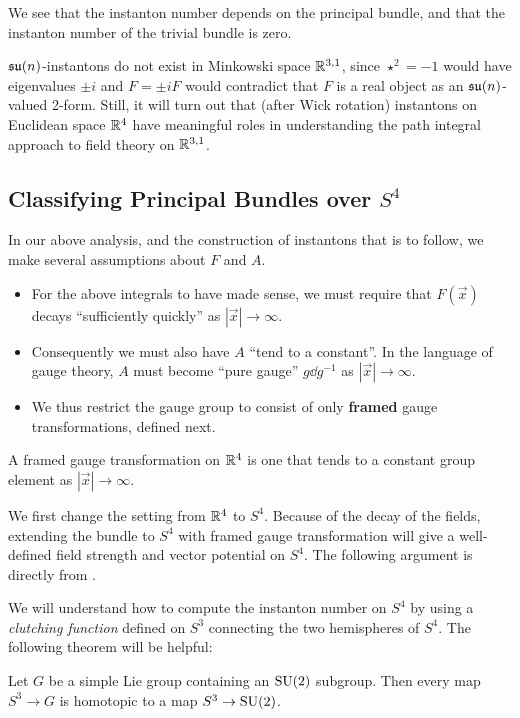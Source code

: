 	We see that the instanton number depends on the principal bundle, and that the instanton number of the trivial bundle is zero. 
	
	\begin{nb}
		$\frak{su}(n)$-instantons do not exist in Minkowski space $\mathbb{R}^{3,1}$, since $\star^2 = -1$ would have eigenvalues $\pm i$ and $F = \pm i F$ would contradict that $F$ is a real object as an $\frak{su}(n)$-valued 2-form. Still, it will turn out that (after Wick rotation) instantons on Euclidean space $\mathbb{R}^4$ have meaningful roles in understanding the path integral approach to field theory on $\mathbb{R}^{3,1}$.
	\end{nb}



	\subsection{Classifying Principal Bundles over $S^4$} %
	\label{sub:classifying_principal_bundles_over_s_4}

		In our above analysis, and the construction of instantons that is to follow, we make several assumptions about $F$ and $A$.
		\begin{itemize}
			\item For the above integrals to have made sense, we must require that $F(\vec x)$ decays ``sufficiently quickly'' as $|\vec x| \to \infty$.
			\item Consequently we must also have $A$ ``tend to a constant''. In the language of gauge theory, $A$ must become ``pure gauge'' $g \dd g^{-1}$ as $|\vec x| \to \infty$.
			\item We thus restrict the gauge group to consist of only \textbf{framed} gauge transformations, defined next.
		\end{itemize}
		\begin{defn}
			A framed gauge transformation on $\mathbb{R}^4$ is one that tends to a constant group element as $|\vec x| \to \infty$.
		\end{defn}

		We first change the setting from $\mathbb{R}^4$ to $S^4$. Because of the decay of the fields, extending the bundle to $S^4$ with framed gauge transformation will give a well-defined field strength and vector potential on $S^4$. The following argument is directly from \cite{lindenhovius2011}.
	
		We will understand how to compute the instanton number on $S^4$ by using a \emph{clutching function} defined on $S^3$ connecting the two hemispheres of $S^4$.
		The following theorem will be helpful:
		\begin{theorem}[Bott]
			Let $G$ be a simple Lie group containing an $\mathrm{SU}(2)$ subgroup. Then every map $S^3 \to G$ is homotopic to a map $S^3 \to \mathrm{SU}(2)$. 
		\end{theorem}
		
